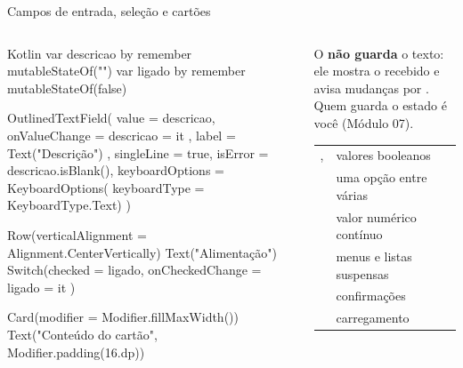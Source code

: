 \documentclass[aspectratio=169,10pt]{beamer}
\begin{document}
\begin{frame}[fragile]{Campos de entrada, seleção e cartões}
  \begin{columns}[T]
    \begin{column}{0.54\textwidth}
\begin{codigo}[title=Entrada de dados]{Kotlin}
var descricao by remember { mutableStateOf("") }
var ligado by remember { mutableStateOf(false) }

OutlinedTextField(
  value = descricao,
  onValueChange = { descricao = it },
  label = { Text("Descrição") },
  singleLine = true,
  isError = descricao.isBlank(),
  keyboardOptions = KeyboardOptions(
    keyboardType = KeyboardType.Text)
)

Row(verticalAlignment = Alignment.CenterVertically) {
  Text("Alimentação")
  Switch(checked = ligado, onCheckedChange = { ligado = it })
}

Card(modifier = Modifier.fillMaxWidth()) {
  Text("Conteúdo do cartão", Modifier.padding(16.dp))
}
\end{codigo}
    \end{column}
    \begin{column}{0.44\textwidth}
      \begin{conceito}
        O  \textbf{não guarda} o texto: ele mostra o  recebido e avisa mudanças por . Quem guarda o estado é você (Módulo 07).
      \end{conceito}
      \scriptsize
      \begin{tabularx}{\linewidth}{@{}l L@{}}
        \toprule
         &  \\
        \midrule
        ,  & valores booleanos \\
         & uma opção entre várias \\
         & valor numérico contínuo \\
         & menus e listas suspensas \\
         & confirmações \\
         & carregamento \\
        \bottomrule
      \end{tabularx}
    \end{column}
  \end{columns}
\end{frame}
\end{document}

